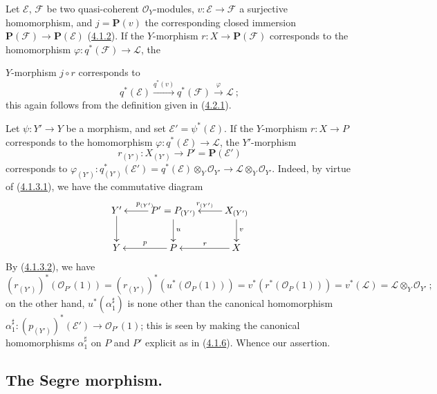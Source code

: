 \begin{env}[4.2.9]
\label{II.4.2.9}
Let $\mathcal{E}$, $\mathcal{F}$ be two quasi-coherent $\mathcal{O}_Y$-modules,
$v:\mathcal{E}\to\mathcal{F}$ a surjective homomorphism, and
$j=\mathbf{P}(v)$ the corresponding closed immersion
$\mathbf{P}(\mathcal{F})\to\mathbf{P}(\mathcal{E})$
(\hyperref[II.4.1.2]{4.1.2}). If the $Y$-morphism
$r:X\to\mathbf{P}(\mathcal{F})$ corresponds to the homomorphism
$\varphi:q^*(\mathcal{F})\to\mathcal{L}$, the


$Y$-morphism $j\circ r$ corresponds to
\[
  q^*(\mathcal{E})\xrightarrow{q^*(v)}q^*(\mathcal{F})
  \xrightarrow{\varphi}\mathcal{L}~;
\]
this again follows from the definition given in
(\hyperref[II.4.2.1]{4.2.1}).
\end{env}

\begin{env}[4.2.10]
\label{II.4.2.10}
Let $\psi:Y'\to Y$ be a morphism, and set
$\mathcal{E}'=\psi^*(\mathcal{E})$. If the $Y$-morphism $r:X\to P$ corresponds
to the homomorphism $\varphi:q^*(\mathcal{E})\to\mathcal{L}$, the
$Y'$-morphism
\[
  r_{(Y')}:X_{(Y')}\longrightarrow P'=\mathbf{P}(\mathcal{E}')
\]
corresponds to
$\varphi_{(Y')}:q_{(Y')}^*(\mathcal{E}')=
  q^*(\mathcal{E})\otimes_Y\mathcal{O}_{Y'}\to
\mathcal{L}\otimes_Y\mathcal{O}_{Y'}$. Indeed, by virtue of
(\hyperref[II.4.1.3.1]{4.1.3.1}), we have the commutative diagram
\[
  \xymatrix{
    Y' \ar[d]
    & P'=P_{(Y')} \ar[l]_{p_{(Y')}} \ar[d]^{u}
    & X_{(Y')} \ar[l]_{r_{(Y')}} \ar[d]^{v}
    \\Y
    & P \ar[l]_{p}
    & X \ar[l]_{r}
  }
\]
By (\hyperref[II.4.1.3.2]{4.1.3.2}), we have
\[
  (r_{(Y')})^*(\mathcal{O}_{P'}(1))
  =(r_{(Y')})^*(u^*(\mathcal{O}_P(1)))
  =v^*(r^*(\mathcal{O}_P(1)))
  =v^*(\mathcal{L})=\mathcal{L}\otimes_Y\mathcal{O}_{Y'}~;
\]
on the other hand, $u^*(\alpha_1^\sharp)$ is none other than the canonical
homomorphism
$\alpha_1^\sharp:(p_{(Y')})^*(\mathcal{E}')\to\mathcal{O}_{P'}(1)$; this
is seen by making the canonical homomorphisms $\alpha_1^\sharp$ on
$P$ and $P'$ explicit as in (\hyperref[II.4.1.6]{4.1.6}). Whence our assertion.
\end{env}

\subsection{The Segre morphism.}
\label{subsection:II.4.3}


